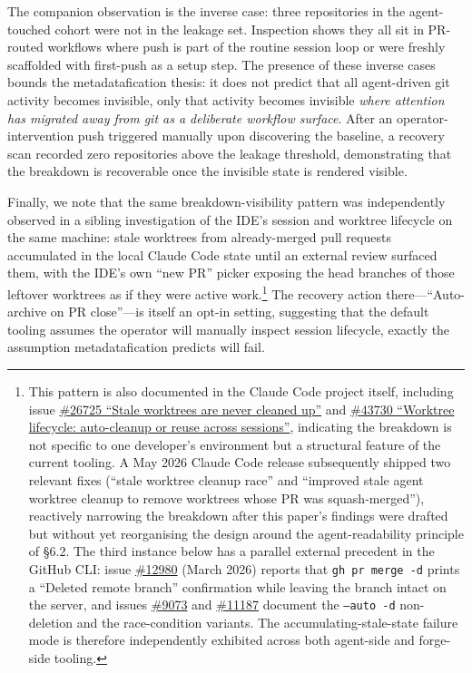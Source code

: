 \documentclass[sigconf, nonacm, anonymous=false]{acmart}
\begin{document}
The companion observation is the inverse case: three repositories in the agent-touched cohort were not in the leakage set. Inspection shows they all sit in PR-routed workflows where push is part of the routine session loop or were freshly scaffolded with first-push as a setup step. The presence of these inverse cases bounds the metadatafication thesis: it does not predict that all agent-driven git activity becomes invisible, only that activity becomes invisible \textit{where attention has migrated away from git as a deliberate workflow surface}. After an operator-intervention push triggered manually upon discovering the baseline, a recovery scan recorded zero repositories above the leakage threshold, demonstrating that the breakdown is recoverable once the invisible state is rendered visible.

Finally, we note that the same breakdown-visibility pattern was independently observed in a sibling investigation of the IDE's session and worktree lifecycle on the same machine: stale worktrees from already-merged pull requests accumulated in the local Claude Code state until an external review surfaced them, with the IDE's own ``new PR'' picker exposing the head branches of those leftover worktrees as if they were active work.\footnote{This pattern is also documented in the Claude Code project itself, including issue \href{https://github.com/anthropics/claude-code/issues/26725}{\#26725 ``Stale worktrees are never cleaned up''} and \href{https://github.com/anthropics/claude-code/issues/43730}{\#43730 ``Worktree lifecycle: auto-cleanup or reuse across sessions''}, indicating the breakdown is not specific to one developer's environment but a structural feature of the current tooling. A May 2026 Claude Code release subsequently shipped two relevant fixes (``stale worktree cleanup race'' and ``improved stale agent worktree cleanup to remove worktrees whose PR was squash-merged''), reactively narrowing the breakdown after this paper's findings were drafted but without yet reorganising the design around the agent-readability principle of \S6.2. The third instance below has a parallel external precedent in the GitHub CLI: issue \href{https://github.com/cli/cli/issues/12980}{\#12980} (March 2026) reports that \texttt{gh pr merge -d} prints a ``Deleted remote branch'' confirmation while leaving the branch intact on the server, and issues \href{https://github.com/cli/cli/issues/9073}{\#9073} and \href{https://github.com/cli/cli/issues/11187}{\#11187} document the \texttt{--auto -d} non-deletion and the race-condition variants. The accumulating-stale-state failure mode is therefore independently exhibited across both agent-side and forge-side tooling.} The recovery action there---``Auto-archive on PR close''---is itself an opt-in setting, suggesting that the default tooling assumes the operator will manually inspect session lifecycle, exactly the assumption metadatafication predicts will fail.
\end{document}
